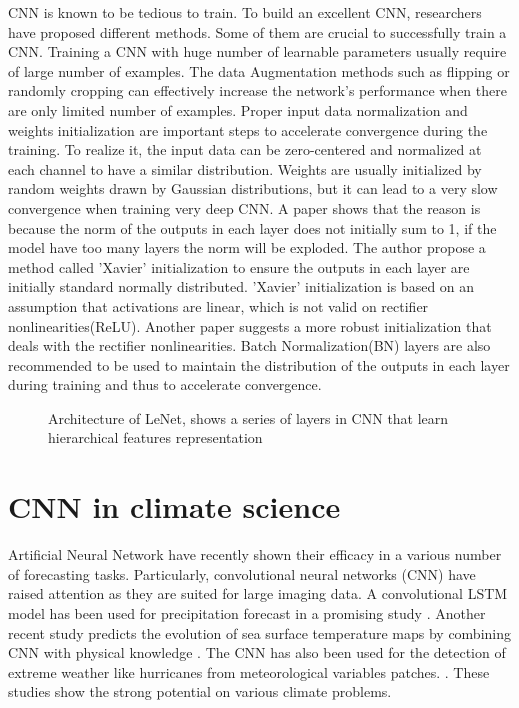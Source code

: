CNN is known to be tedious to train. To build an excellent CNN, researchers have proposed different methods. Some of them are crucial to successfully train a CNN. Training a CNN with huge number of learnable parameters usually require of large number of examples. The data Augmentation methods such as flipping or randomly cropping can effectively increase the network's performance when there are only limited number of examples. Proper input data normalization and weights initialization are important steps to accelerate convergence during the training. To realize it, the input data can be zero-centered and normalized at each channel to have a similar distribution. Weights are usually initialized by random weights drawn by Gaussian distributions\cite{krizhevsky2012imagenet}, but it can lead to a very slow convergence when training very deep CNN. A paper\cite{glorot2010understanding} shows that the reason is because the norm of the outputs in each layer does not initially sum to 1, if the model have too many layers the norm will be exploded. The author propose a method called 'Xavier' initialization to ensure the outputs in each layer are initially standard normally distributed. 'Xavier' initialization is based on an assumption that activations are linear, which is not valid on rectifier nonlinearities(ReLU). Another paper\cite{he2015delving} suggests a more robust initialization that deals with the rectifier nonlinearities. Batch Normalization(BN) layers are also recommended to be used to maintain the distribution of the outputs in each layer during training and thus to accelerate convergence\cite{krizhevsky2012imagenet}. 

\begin{figure}
	\begin{center}
		\hsize {}
	\end{center}
	\caption{Architecture of LeNet, shows a series of layers in CNN that learn hierarchical features representation \cite{lecun1998gradient} }
	\label{fig:LeNet}
\end{figure}


\section{CNN in climate science}
 Artificial Neural Network have recently shown their efficacy in a various number of forecasting tasks. Particularly, convolutional neural networks (CNN) have raised attention as they are suited for large imaging data. A convolutional LSTM model has been used for precipitation forecast in a promising study \cite{xingjian2015convolutional}. Another recent study predicts the evolution of sea surface temperature maps by combining CNN with physical knowledge \cite{de2017deep}. The CNN has also been used for the detection of extreme weather like hurricanes from meteorological variables patches. \cite{racah2017extremeweather}. These studies show the strong potential on various climate problems. 

